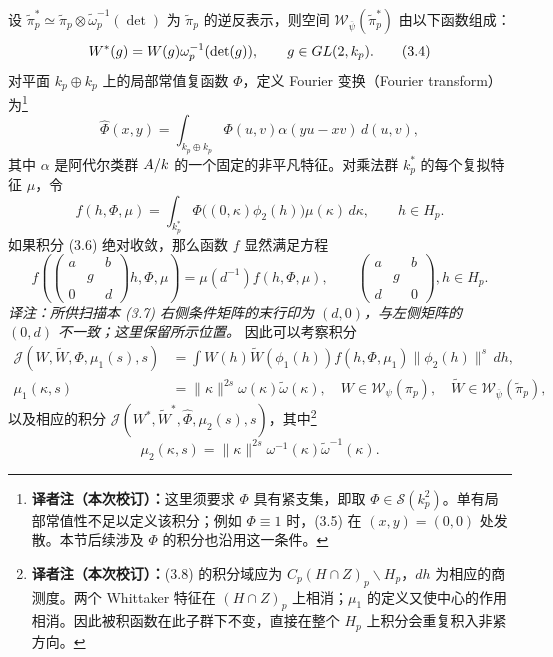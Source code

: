 设 $\widetilde\pi_p^*\simeq\widetilde\pi_p\otimes\widetilde\omega_p^{-1}(\det)$ 为 $\widetilde\pi_p$ 的逆反表示，则空间 $\mathcal W_{\overline\psi}(\widetilde\pi_p^*)$ 由以下函数组成：
\begin{equation}
 W^*(g)=W(g)\omega_p^{-1}(\det(g)),
 \qquad g\in GL(2,k_p).
 \tag{3.4}
\end{equation}
对平面 $k_p\oplus k_p$ 上的局部常值复函数 $\Phi$，定义 Fourier 变换（Fourier transform）为\footnote{\textbf{译者注（本次校订）：}这里须要求 $\Phi$ 具有紧支集，即取 $\Phi\in\mathcal S(k_p^2)$。单有局部常值性不足以定义该积分；例如 $\Phi\equiv1$ 时，(3.5) 在 $(x,y)=(0,0)$ 处发散。本节后续涉及 $\Phi$ 的积分也沿用这一条件。}
\begin{equation}
 \widehat\Phi(x,y)=\int_{k_p\oplus k_p}\Phi(u,v)\alpha(yu-xv)\,d(u,v),
 \tag{3.5}
\end{equation}
其中 $\alpha$ 是阿代尔类群 $A/k$ 的一个固定的非平凡特征。对乘法群 $k_p^*$ 的每个复拟特征 $\mu$，令
\begin{equation}
 f(h,\Phi,\mu)=\int_{k_p^*}\Phi\bigl((0,\kappa)\phi_2(h)\bigr)\mu(\kappa)\,d\kappa,
 \qquad h\in H_p.
 \tag{3.6}
\end{equation}
如果积分 (3.6) 绝对收敛，那么函数 $f$ 显然满足方程
\begin{equation}
 f\left(\begin{pmatrix}a&&b\\&g&\\0&&d\end{pmatrix}h,\Phi,\mu\right)
 =\mu(d^{-1})f(h,\Phi,\mu),
 \qquad \begin{pmatrix}a&&b\\&g&\\d&&0\end{pmatrix},h\in H_p.
 \tag{3.7}
\end{equation}
\noindent\emph{译注：所供扫描本 (3.7) 右侧条件矩阵的末行印为 $(d,0)$，与左侧矩阵的 $(0,d)$ 不一致；这里保留所示位置。}
因此可以考察积分
\begin{equation}
 \begin{aligned}
 \mathcal J(W,\widetilde W,\Phi,\mu_1(s),s)
 &=\int W(h)\widetilde W(\phi_1(h))f(h,\Phi,\mu_1)
 \|\phi_2(h)\|^s\,dh,\\
 \mu_1(\kappa,s)&=\|\kappa\|^{2s}\omega(\kappa)\widetilde\omega(\kappa),
 \quad W\in\mathcal W_\psi(\pi_p),\quad
 \widetilde W\in\mathcal W_{\overline\psi}(\widetilde\pi_p),
 \end{aligned}
 \tag{3.8}
\end{equation}
以及相应的积分 $\mathcal J(W^*,\widetilde W^*,\widehat\Phi,\mu_2(s),s)$，其中\footnote{\textbf{译者注（本次校订）：}(3.8) 的积分域应为 $C_p(H\cap Z)_p\backslash H_p$，$dh$ 为相应的商测度。两个 Whittaker 特征在 $(H\cap Z)_p$ 上相消；$\mu_1$ 的定义又使中心的作用相消。因此被积函数在此子群下不变，直接在整个 $H_p$ 上积分会重复积入非紧方向。}
\[
 \mu_2(\kappa,s)=\|\kappa\|^{2s}\omega^{-1}(\kappa)\widetilde\omega^{-1}(\kappa).
\]


